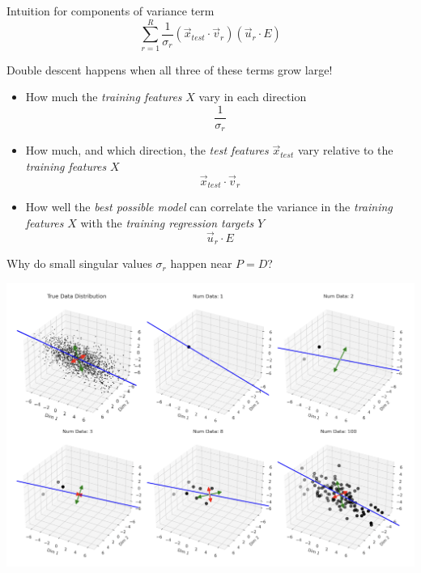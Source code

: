 \documentclass{beamer}
\begin{document}
\begin{frame}{Intuition for components of variance term}
    \begin{equation}
        \sum_{r=1}^R \frac{1}{\sigma_r}(\vec{x}_{test} \cdot \vec{v}_r)(\vec{u}_r \cdot E)
    \end{equation}
    
    Double descent happens when all three of these terms grow large!
    
    \begin{itemize}
        \item How much the \emph{training features} $X$ vary in each direction
            $$\frac{1}{\sigma_r}$$
        \pause
        \item How much, and which direction, the \emph{test features} $\vec{x}_{test}$ vary relative to the \emph{training features} $X$
        $$\vec{x}_{test} \cdot \vec{v}_r$$
        \pause
        \item How well the \emph{best possible model} can correlate the variance in the \emph{training features} $X$ with the \emph{training regression targets} $Y$
            $$\vec{u}_r \cdot E$$
    \end{itemize}

\end{frame}

\begin{frame}{Why do small singular values $\sigma_r$ happen near $P=D$?}
    \begin{center}
        \includegraphics[scale=0.28]{singularvals.png}
    \end{center}
\end{frame}
\end{document}
